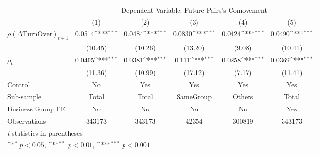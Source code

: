{
\def\sym#1{\ifmmode^{#1}\else\(^{#1}\)\fi}
\begin{tabular}{l*{5}{c}}
\hline\hline
                    &\multicolumn{5}{c}{Dependent Variable:  Future Pairs's Comovement}                                           \\\cmidrule(lr){2-6}
                    &\multicolumn{1}{c}{(1)}         &\multicolumn{1}{c}{(2)}         &\multicolumn{1}{c}{(3)}         &\multicolumn{1}{c}{(4)}         &\multicolumn{1}{c}{(5)}         \\
\hline
 $ {\rho(\Delta \text{TurnOver})_{t+1}} $ &      0.0514\sym{***}&      0.0484\sym{***}&      0.0830\sym{***}&      0.0424\sym{***}&      0.0490\sym{***}\\
                    &     (10.45)         &     (10.26)         &     (13.20)         &      (9.08)         &     (10.41)         \\
[1em]
 $ {\rho_t} $       &      0.0405\sym{***}&      0.0381\sym{***}&       0.111\sym{***}&      0.0258\sym{***}&      0.0369\sym{***}\\
                    &     (11.36)         &     (10.99)         &     (17.12)         &      (7.17)         &     (11.41)         \\
\hline
Control             &          No         &         Yes         &         Yes         &         Yes         &         Yes         \\
Sub-sample          &       Total         &       Total         &   SameGroup         &      Others         &       Total         \\
Business Group FE   &          No         &          No         &          No         &          No         &         Yes         \\
Observations        &      343173         &      343173         &       42354         &      300819         &      343173         \\
\hline\hline
\multicolumn{6}{l}{\footnotesize \textit{t} statistics in parentheses}\\
\multicolumn{6}{l}{\footnotesize \sym{*} \(p<0.05\), \sym{**} \(p<0.01\), \sym{***} \(p<0.001\)}\\
\end{tabular}
}
